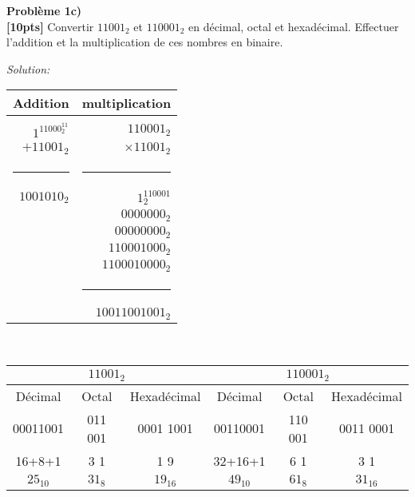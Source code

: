 \documentclass{article}
\newenvironment{problem}[2][Problème]
    { \begin{mdframed}[backgroundcolor=gray!20] \textbf{#1 #2} \\}
    {  \end{mdframed}}
\newenvironment{solution}
    {\textit{Solution:}}
    {}
\begin{document}
\begin{problem}{1c)}
\textbf{[10pts]} Convertir $11001_2$ et $110001_2$ en décimal, octal et hexadécimal. Effectuer l’addition et la multiplication de ces nombres en binaire.
\end{problem}
\begin{solution}
    \begin{tabular}{r|r}
        \large Addition & \large multiplication\\
        \hline \\ 
        \huge $1^11000^11_2$  & \huge $110001_2$\\
        \huge $+ 11001_2$       & \huge $\times 11001_2$\\
        \rule{1in}{2pt}         & \rule{1in}{2pt}\\
        \huge $1001010_2$       &  \Large $1^110001_2$\\
         & \Large $0000000_2$ \hspace{6pt}\\
         & \Large $00000000_2$ \hspace{8pt}\\
         & \Large $110001000_2$ \hspace{12pt}\\
         & \Large $1100010000_2$ \hspace{12pt}\\
         & \rule{1.2in}{2pt}\\
         & \Large $10011001001_2$
    \end{tabular}
    \\

    \begin{tabular}{|c|c|c|c|c|c|}
        \hline
        \multicolumn{3}{|c|}{\large $11001_2$} & \multicolumn{3}{|c|}{\large $110001_2$}\\
        \hline
        Décimal & Octal & Hexadécimal & Décimal & Octal & Hexadécimal\\
        \hline
        00011001 & 011 001 & 0001 1001 & 00110001 & 110 001 & 0011 0001\\
        16+8+1& 3\hspace{10pt} 1 & 1 \hspace{5pt}9 & 32+16+1 & 6\hspace{10pt} 1 & 3\hspace{5pt} 1\\
        $25_{10}$ & $31_8$ & $19_{16}$ & $49_{10}$ & $61_8$ & $31_{16}$\\
        \hline
    \end{tabular}
\end{solution}
\end{document}
